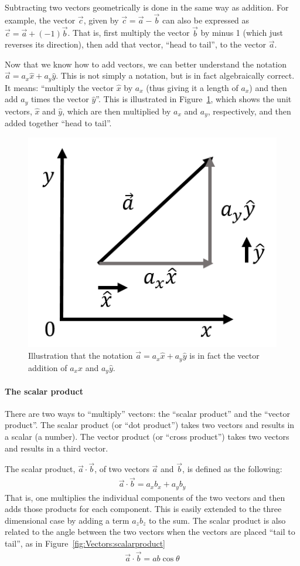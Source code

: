Subtracting two vectors geometrically is done in the same way as addition. For example, the vector $\vec c$, given by $\vec c=\vec a -\vec b$ can also be expressed as $\vec c = \vec a + ( -1) \vec b$. That is, first multiply the vector $\vec b$ by minus 1 (which just reverses its direction), then add that vector, ``head to tail'', to the vector $\vec a$.

Now that we know how to add vectors, we can better understand the notation $\vec a = a_x \hat x+ a_y\hat y$. This is not simply a notation, but is in fact algebraically correct. It means: ``multiply the vector $\hat x$ by $a_x$ (thus giving it a length of $a_x$) and then add $a_y$ times the vector $\hat y$''. This is illustrated in Figure~\ref{fig:Vectors:acomponents}, which shows the unit vectors, $\hat x$ and $\hat y$, which are then multiplied by $a_x$ and $a_y$, respectively, and then added together ``head to tail''.

\begin{figure}[!htbp]
\centering
\includegraphics[width=0.375\linewidth]{files/acomponents-4093cabc11330a40aa3366764b387b46.png}
\caption[]{Illustration that the notation $\vec a = a_x \hat x+ a_y\hat y$ is in fact the vector addition of $a_x \hat x$ and $a_y \hat y$.}
\label{fig:Vectors:acomponents}
\end{figure}

\paragraph{The scalar product}\label{sec:Vectors:scalarproduct}

There are two ways to ``multiply'' vectors: the ``scalar product'' and the ``vector product''. The scalar product (or ``dot product'') takes two vectors and results in a scalar (a number). The vector product (or ``cross product'') takes two vectors and results in a third vector.

The scalar product, $\vec a \cdot \vec b$, of two vectors $\vec a$ and $\vec b$, is defined as the following:
\begin{align*}
\vec a \cdot \vec b=a_xb_x +a_yb_y
\end{align*}
That is, one multiplies the individual components of the two vectors and then adds those products for each component. This is easily extended to the three dimensional case by adding a term $a_zb_z$ to the sum. The scalar product is also related to the angle between the two vectors when the vectors are placed ``tail to tail'', as in Figure~\ref{fig:Vectors:scalarproduct}
\begin{align*}
\vec a \cdot \vec b= ab\cos\theta
\end{align*}

